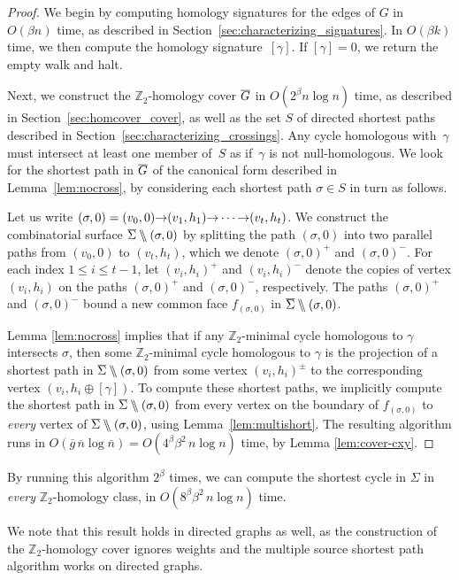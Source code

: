 \documentclass[11pt,twoside]{article}
\def\arcto{\mathord\shortrightarrow}
\def\Z{\mathbb{Z}}
\def\snip{\mathbin{\raisebox{0.15ex}{\rotatebox[origin=c]{60}{\Rightscissors}\!}}}
\def\snip{\mathbin{\backslash\!\!\backslash}}
\def\cycle{\gamma}
\def\Sigmabar{\overline{\smash{\Sigma}\vphantom{t}}}
\def\Gbar{\overline{\smash{G}\vphantom{t}}}
\def\nbar{\overline{n}}
\def\gbar{\overline{g}}
\begin{document}
{\begin{proof}
We begin by computing homology signatures for the edges of $G$ in $O(\beta n)$ time, as described in Section~\ref{sec:characterizing_signatures}.  In $O(\beta k)$ time, we then compute the homology signature~$[\cycle]$.  If $[\cycle] = 0$, we return the empty walk and halt.

Next, we construct the $\Z_2$-homology cover $\Gbar$ in $O(2^\beta n\log n)$ time, as described in Section~\ref{sec:homcover_cover}, as well as the set $S$ of directed shortest paths described in Section~\ref{sec:characterizing_crossings}.
Any cycle homologous with~$\cycle$ must intersect at least one member of~$S$ as if~$\cycle$ is not null-homologous.
We look for the shortest path in $\Gbar$ of the canonical form described in Lemma~\ref{lem:nocross}, by considering each shortest path $\sigma\in S$ in turn as follows.

Let us write $(\sigma,0) = (v_0,0) \arcto (v_1,h_1) \arcto\allowbreak \cdots\arcto (v_t, h_t)$.  We construct the combinatorial surface $\Sigmabar\snip(\sigma,0)$ by splitting the path $(\sigma,0)$ into two parallel paths from $(v_0,0)$ to $(v_t,h_t)$, which we denote  $(\sigma,0)^+$ and $(\sigma,0)^-$.  For each index $1\le i\le t-1$, let $(v_i,h_i)^+$ and $(v_i,h_i)^-$ denote the copies of vertex $(v_i,h_i)$  on the paths $(\sigma,0)^+$ and $(\sigma,0)^-$, respectively.  The paths $(\sigma,0)^+$ and $(\sigma,0)^-$ bound a new common face $f_{(\sigma,0)}$ in $\Sigmabar\snip(\sigma,0)$.

Lemma \ref{lem:nocross} implies that if any $\Z_2$-minimal cycle homologous to $\cycle$ intersects $\sigma$, then some $\Z_2$-minimal cycle homologous to $\cycle$ is the projection of a shortest path in $\Sigmabar\snip(\sigma,0)$ from some vertex $(v_i,h_i)^\pm$ to the corresponding vertex $(v_i, h_i\oplus[\cycle])$.  To compute these shortest paths, we implicitly compute the shortest path in $\Sigmabar\snip(\sigma,0)$ from every vertex on the boundary of $f_{(\sigma,0)}$ to \emph{every} vertex of $\Sigmabar\snip(\sigma,0)$, using Lemma~\ref{lem:multishort}.  The resulting algorithm runs in $O(\gbar\,\nbar \log \nbar) = O(4^\beta \beta^2\, n\log n)$ time, by Lemma \ref{lem:cover-cxy}.
\end{proof}

By running this algorithm $2^\beta$ times, we can compute the shortest cycle in $\Sigma$ in \emph{every} $\Z_2$-homology class, in $O(8^\beta \beta^2\, n\log n)$ time.

We note that this result holds in directed graphs as well, as the construction of the $\Z_2$-homology cover ignores weights and the multiple source shortest path algorithm works on directed graphs.


}
\end{document}
